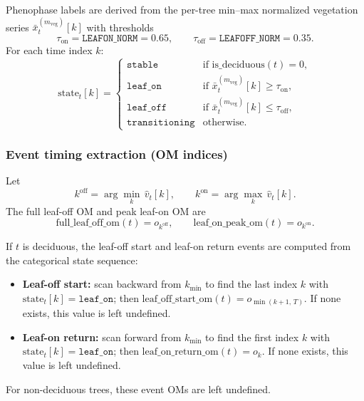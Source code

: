 Phenophase labels are derived from the per-tree min--max normalized vegetation series
$\bar{x}^{(m_\mathrm{veg})}_t[k]$ with thresholds
\begin{equation}
\tau_{\mathrm{on}}=\texttt{LEAFON\_NORM}=0.65,\qquad
\tau_{\mathrm{off}}=\texttt{LEAFOFF\_NORM}=0.35.
\end{equation}
For each time index $k$:
\begin{equation}
\mathrm{state}_{t}[k] =
\begin{cases}
\texttt{stable} & \text{if } \mathrm{is\_deciduous}(t)=0,\\
\texttt{leaf\_on} & \text{if } \bar{x}^{(m_\mathrm{veg})}_t[k]\ge \tau_{\mathrm{on}},\\
\texttt{leaf\_off} & \text{if } \bar{x}^{(m_\mathrm{veg})}_t[k]\le \tau_{\mathrm{off}},\\
\texttt{transitioning} & \text{otherwise.}
\end{cases}
\end{equation}

\subsubsection{Event timing extraction (OM indices)}

Let
\begin{equation}
 k^{\mathrm{off}}=\arg\min_{k} \,\hat{v}_t[k],\qquad k^{\mathrm{on}}=\arg\max_{k} \,\hat{v}_t[k].
\end{equation}
The full leaf-off OM and peak leaf-on OM are
\begin{equation}
\mathrm{full\_leaf\_off\_om}(t)=o_{k^{\mathrm{off}}},\qquad
\mathrm{leaf\_on\_peak\_om}(t)=o_{k^{\mathrm{on}}}.
\end{equation}

If $t$ is deciduous, the leaf-off start and leaf-on return events are computed from the categorical state sequence:
\begin{itemize}[leftmargin=*, itemsep=2pt]
\item \textbf{Leaf-off start:} scan backward from $k_{\min}$ to find the last index $k$ with $\mathrm{state}_t[k]=\texttt{leaf\_on}$;
then
$\mathrm{leaf\_off\_start\_om}(t)=o_{\min(k+1,\,T)}$. If none exists, this value is left undefined.
\item \textbf{Leaf-on return:} scan forward from $k_{\min}$ to find the first index $k$ with $\mathrm{state}_t[k]=\texttt{leaf\_on}$;
then
$\mathrm{leaf\_on\_return\_om}(t)=o_k$. If none exists, this value is left undefined.
\end{itemize}
For non-deciduous trees, these event OMs are left undefined.

